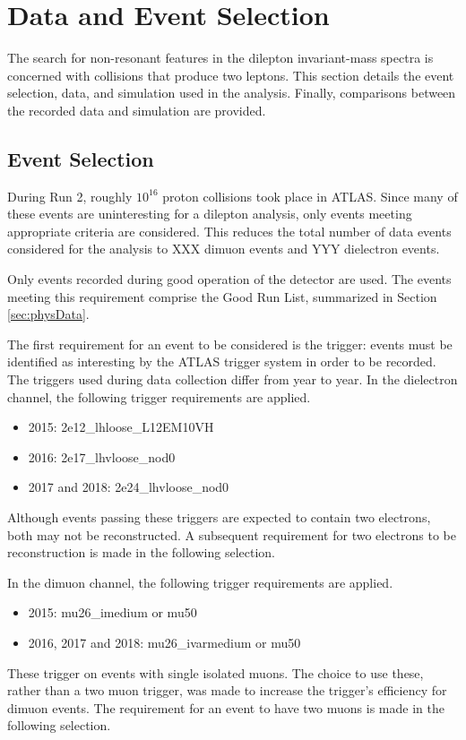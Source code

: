 \section{Data and Event Selection}\label{sec:ciEvSel}

The search for non-resonant features in the dilepton invariant-mass spectra is concerned with collisions that produce two leptons.
This section details the event selection, data, and simulation used in the analysis.
Finally, comparisons between the recorded data and simulation are provided.


\subsection{Event Selection}
During Run 2, roughly $10^{16}$ proton collisions took place in ATLAS. \check
Since many of these events are uninteresting for a dilepton analysis, only events meeting appropriate criteria are considered.
This reduces the total number of data events considered for the analysis to {\color{red}XXX} dimuon events and {\color{red}YYY} dielectron events.

Only events recorded during good operation of the detector are used.
The events meeting this requirement comprise the Good Run List, summarized in Section \ref{sec:physData}.

The first requirement for an event to be considered is the trigger: events must be identified as interesting by the ATLAS trigger system in order to be recorded.
The triggers used during data collection differ from year to year. 
In the dielectron channel, the following trigger requirements are applied.
\begin{itemize}
	\item 2015: 2e12\_lhloose\_L12EM10VH
	\item 2016: 2e17\_lhvloose\_nod0
	\item 2017 and 2018: 2e24\_lhvloose\_nod0
\end{itemize}
Although events passing these triggers are expected to contain two electrons, both may not be reconstructed. 
A subsequent requirement for two electrons to be reconstruction is made in the following selection.

In the dimuon channel, the following trigger requirements are applied.
\begin{itemize}
	\item 2015: mu26\_imedium or mu50
	\item 2016, 2017 and 2018: mu26\_ivarmedium or mu50
\end{itemize}
These trigger on events with single isolated muons. 
The choice to use these, rather than a two muon trigger, was made to increase the trigger's efficiency for dimuon events.
The requirement for an event to have two muons is made in the following selection.

